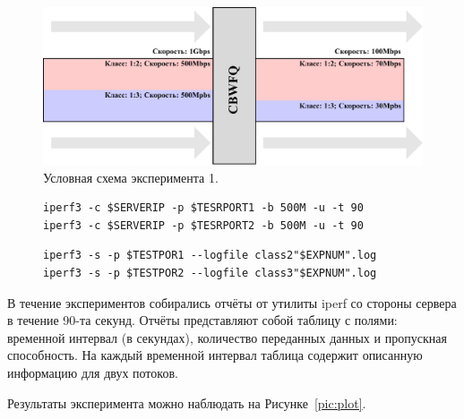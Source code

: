 		\begin{figure}[ht!]
			\center
			\includegraphics[scale=0.9]{./pdfimages/exp_scheme.pdf}
			\caption{Условная схема эксперимента 1.}
			\label{pic:exp1}
		\end{figure}

        \begin{figure}[ht!]
    		\center
    		\begin{lstlisting}[frame=lines,
    						  caption={Команда iperf на узле-источнике (клиентская сторона).},
    						  label={lst:iperfsrc}]
iperf3 -c $SERVERIP -p $TESRPORT1 -b 500M -u -t 90
iperf3 -c $SERVERIP -p $TESRPORT2 -b 500M -u -t 90
    		\end{lstlisting}
        \end{figure}	
        \begin{figure}[ht!]
    		\center
    		\begin{lstlisting}[frame=lines,
    						  caption={Команда iperf на узле-цели (серверная сторона).},
    						  label={lst:iperfdst}]
iperf3 -s -p $TESTPOR1 --logfile class2"$EXPNUM".log
iperf3 -s -p $TESTPOR2 --logfile class3"$EXPNUM".log
    		\end{lstlisting}
        \end{figure}


    		В течение экспериментов собирались отчёты от утилиты iperf со стороны сервера в
    		течение 90-та секунд. Отчёты представляют собой таблицу с полями:
			временной интервал (в секундах), количество переданных данных и пропускная способность.
			На каждый временной интервал таблица содержит описанную информацию для двух потоков.

			Результаты эксперимента можно наблюдать на Рисунке~\ref{pic:plot}.



